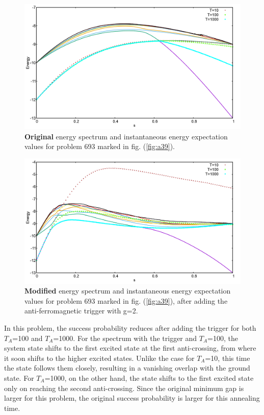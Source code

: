 \documentclass[../main.tex]{subfiles}
\begin{document}
\begin{figure}[H]
\centering 
\includegraphics[scale=0.25]{693_O_g2.png}
\caption{\textbf{Original} energy spectrum and instantaneous energy expectation values for problem 693 marked in fig. (\ref{fig:a39}).}
\label{fig:a28}
\end{figure}
\begin{figure}[H]
\centering 
\includegraphics[scale=0.25]{693_A_g2.png}
\caption{\textbf{Modified} energy spectrum and instantaneous energy expectation values for problem 693 marked in fig. (\ref{fig:a39}), after adding the anti-ferromagnetic trigger with g=2.}
\label{fig:a29}
\end{figure}

In this problem, the success probability reduces after adding the trigger for both $T_A$=100 and $T_A$=1000. For the spectrum with the trigger and $T_A$=100, the system state shifts to the first excited state at the first anti-crossing, from where it soon shifts to the higher excited states. Unlike the case for $T_A$=10, this time the state follows them closely, resulting in a vanishing overlap with the ground state. For $T_A$=1000, on the other hand, the state shifts to the first excited state only on reaching the second anti-crossing. Since the original minimum gap is larger for this problem, the original success probability is larger for this annealing time.
\end{document}
